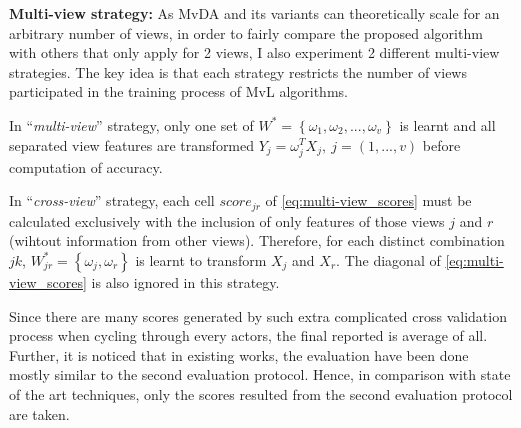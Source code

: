     \textbf{Multi-view strategy:} As MvDA and its variants can theoretically scale for an arbitrary number of views, in order to fairly compare the proposed algorithm with others that only apply for 2 views, I also experiment 2 different multi-view strategies. The key idea is that each strategy restricts the number of views participated in the training process of MvL algorithms.

    In ``\emph{multi-view}'' strategy, only one set of $W^*=\left\{{\omega}_1, {\omega}_2, ..., {\omega}_v\right\}$ is learnt and all separated view features are transformed $Y_j=\omega_j^TX_j,\ j=(1,...,v)$ before computation of accuracy.

    In ``\emph{cross-view}'' strategy, each cell ${score}_{jr}$ of \eqref{eq:multi-view_scores} must be calculated exclusively with the inclusion of only features of those views $j$ and $r$ (wihtout information from other views).
    Therefore, for each distinct combination $jk$, $W_{jr}^*=\left\{{\omega}_j, {\omega}_r\right\}$ is learnt to transform $X_j$ and $X_r$. The diagonal of \eqref{eq:multi-view_scores} is also ignored in this strategy.

    Since there are many scores generated by such extra complicated cross validation process when cycling through every actors, the final reported is average of all.
    Further, it is noticed that in existing works, the evaluation have been done mostly similar to the second evaluation protocol. Hence, in comparison with state of the art techniques, only the scores resulted from the second evaluation protocol are taken.
